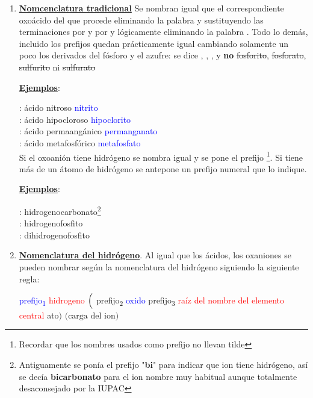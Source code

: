 \documentclass[12pt]{article}
\begin{document}
\begin{enumerate}
    \item \textbf{\uline{Nomcenclatura tradicional}} Se nombran igual que el correspondiente oxoácido del que procede eliminando la palabra  y sustituyendo las terminaciones  por  y  por  y lógicamente eliminando la palabra . Todo lo demás, incluido los prefijos quedan prácticamente igual cambiando solamente un poco los derivados del fósforo y el azufre: se dice , , ,  y \textbf{no} \sout{fosforito}, \sout{fosforato}, \sout{sulfurito} ni \sout{sulfurato}

          \textbf{\uline{Ejemplos}}:

           :  ácido nitroso \ch{->}  \textcolor{blue}{nitrito}\\
           :  ácido hipocloroso \ch{->}  \textcolor{blue}{hipoclorito}\\
           :  ácido permaangánico \ch{->}  \textcolor{blue}{permanganato}\\
           :  ácido metafosfórico \ch{->}  \textcolor{blue}{metafosfato}\\

          Si el oxoanión tiene hidrógeno se nombra igual y se pone el prefijo \footnote{Recordar que los nombres usados como prefijo no llevan tilde}. Si tiene más de un átomo de hidrógeno se antepone un prefijo numeral que lo indique.

          \textbf{\uline{Ejemplos}}:

           :  hidrogenocarbonato\footnote{Antiguamente se ponía el prefijo "\textbf{bi}" para indicar que ion tiene hidrógeno, así se decía \textbf{bicarbonato} para el ion  nombre muy habitual aunque totalmente desaconsejado por la IUPAC}\\
           :  hidrogenofosfito\\
           :  dihidrogenofosfito

    \item \textbf{\uline{Nomenclatura del hidrógeno}}. Al igual que los ácidos, los oxaniones se pueden nombrar según la nomenclatura del hidrógeno siguiendo la siguiente regla:
          \begin{center}
              \textcolor{blue}{prefijo\textsubscript{1}} \textcolor{red}{hidrogeno} $\Bigl($ \textcolor{mygreen}{prefijo\textsubscript{2}} \textcolor{blue}{oxido} \textcolor{myBlue}{prefijo\textsubscript{3}} \textcolor{red}{raíz del nombre del elemento central} \textcolor{mygreen}{ato}$\Bigr)$ $\bigl( \text{carga del ion}\bigr)$
          \end{center}


\end{enumerate}
\end{document}
